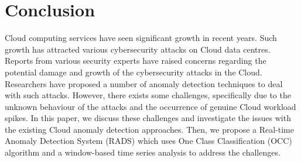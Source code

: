 \section{Conclusion}
\label{sec:conclusions}
\noindent Cloud computing services have seen significant growth in recent years. Such growth has attracted various cybersecurity attacks on Cloud data centres. Reports from various security experts have raised concerns regarding the potential damage and growth of the cybersecurity attacks in the Cloud. 
Researchers have proposed a number of anomaly detection techniques to deal with such attacks. However, there exists some challenges, specifically due to the unknown behaviour of the attacks and the occurrence of genuine Cloud workload spikes.
In this paper, we discuss these challenges and investigate the issues with the existing Cloud anomaly detection approaches. Then, we propose a Real-time Anomaly Detection System (RADS) which uses One Class Classification (OCC) algorithm and a window-based time series analysis to address the challenges. 

